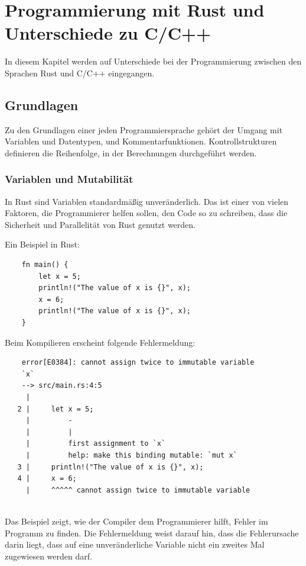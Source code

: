 \chapter{Programmierung mit Rust und Unterschiede zu C/C++}

In diesem Kapitel werden auf Unterschiede bei der Programmierung zwischen den Sprachen Rust und C/C++ eingegangen.


\section{Grundlagen}

Zu den Grundlagen einer jeden Programmiersprache gehört der Umgang mit Variablen und Datentypen, und Kommentarfunktionen. Kontrollstrukturen definieren die Reihenfolge, in der Berechnungen durchgeführt werden.

\subsection{Variablen und Mutabilität}

In Rust sind Variablen standardmäßig unveränderlich. Das ist einer von vielen Faktoren, die Programmierer helfen sollen, den Code so zu schreiben, dass die Sicherheit und Parallelität von Rust genutzt werden. \cite{RustBook}

Ein Beispiel in Rust:

\begin{lstlisting}
    fn main() {
        let x = 5;
        println!("The value of x is {}", x);
        x = 6;
        println!("The value of x is {}", x);
    }
\end{lstlisting}

Beim Kompilieren erscheint folgende Fehlermeldung:

\begin{lstlisting}
    error[E0384]: cannot assign twice to immutable variable 
    `x`
    --> src/main.rs:4:5
     |
   2 |     let x = 5;
     |         -
     |         |
     |         first assignment to `x`
     |         help: make this binding mutable: `mut x`
   3 |     println!("The value of x is {}", x);
   4 |     x = 6;
     |     ^^^^^ cannot assign twice to immutable variable
   
\end{lstlisting}

Das Beispiel zeigt, wie der Compiler dem Programmierer hilft, Fehler im Programm zu finden. Die Fehlermeldung weist darauf hin, dass die Fehlerursache darin liegt, dass auf eine unveränderliche Variable nicht ein zweites Mal zugewiesen werden darf.

